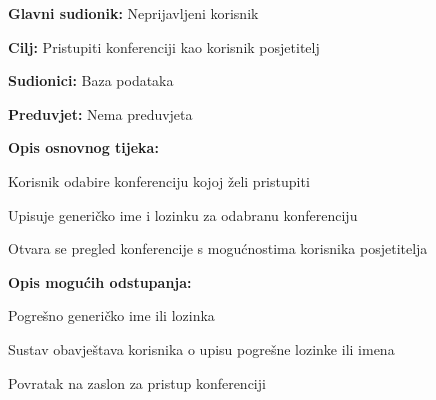 					\noindent {}
					\begin{packed_item}
						
						\item \textbf{Glavni sudionik: } Neprijavljeni korisnik
						\item  \textbf{Cilj:} Pristupiti konferenciji kao korisnik posjetitelj
						\item  \textbf{Sudionici:} Baza podataka
						\item  \textbf{Preduvjet:} Nema preduvjeta
						\item  \textbf{Opis osnovnog tijeka:}
						
						\item[] \begin{packed_enum}
							
							\item Korisnik odabire konferenciju kojoj želi pristupiti
							\item Upisuje generičko ime i lozinku za odabranu konferenciju
							\item Otvara se pregled konferencije s mogućnostima korisnika posjetitelja
						\end{packed_enum}
						
						\item  \textbf{Opis mogućih odstupanja:}
						
						\item[] \begin{packed_item}
							
							\item[2.a] Pogrešno generičko ime ili lozinka
							\item[] \begin{packed_enum}
								
								\item Sustav obavještava korisnika o upisu pogrešne lozinke ili imena
								\item Povratak na zaslon za pristup konferenciji
								
							\end{packed_enum}
							
						\end{packed_item}
					\end{packed_item}
					
